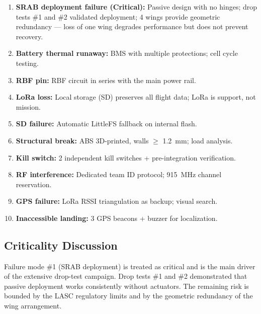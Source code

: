 \begin{enumerate}
\item \textbf{SRAB deployment failure (Critical):} Passive design
  with no hinges; drop tests \#1 and \#2 validated deployment; 4 wings
  provide geometric redundancy --- loss of one wing degrades performance
  but does not prevent recovery.
\item \textbf{Battery thermal runaway:} BMS with multiple protections;
  cell cycle testing.
\item \textbf{RBF pin:} RBF circuit in series with the main power
  rail.
\item \textbf{LoRa loss:} Local storage (SD) preserves all flight
  data; LoRa is support, not mission.
\item \textbf{SD failure:} Automatic LittleFS fallback on internal
  flash.
\item \textbf{Structural break:} ABS 3D-printed, walls $\geq$ 1.2~mm;
  load analysis.
\item \textbf{Kill switch:} 2 independent kill switches + pre-integration
  verification.
\item \textbf{RF interference:} Dedicated team ID protocol; 915~MHz
  channel reservation.
\item \textbf{GPS failure:} LoRa RSSI triangulation as backup; visual
  search.
\item \textbf{Inaccessible landing:} 3 GPS beacons + buzzer for
  localization.
\end{enumerate}

\subsection{Criticality Discussion}

Failure mode \#1 (SRAB deployment) is treated as critical and is the
main driver of the extensive drop-test campaign. Drop tests \#1 and
\#2 demonstrated that passive deployment works consistently without
actuators. The remaining risk is bounded by the LASC regulatory
limits and by the geometric redundancy of the wing arrangement.
